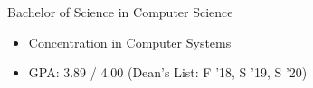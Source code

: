 %
%
%


\begin{projects}

    {Bachelor of Science in Computer Science}
    {
    \begin{itemize}
        \item Concentration in Computer Systems
		\item GPA: 3.89 / 4.00 \hspace{1em}(Dean's List: F '18, S '19, S '20)
	\end{itemize}
    }

\end{projects}
